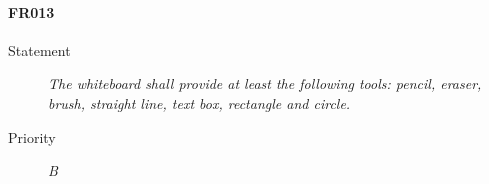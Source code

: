 \paragraph{FR013}
\begin{description}
  \item [Statement] 
  \textit{ The whiteboard shall provide at least the following tools: pencil, eraser, brush, straight line, text box, rectangle and circle.}
\item [Priority] \textit{B}
\end{description}
